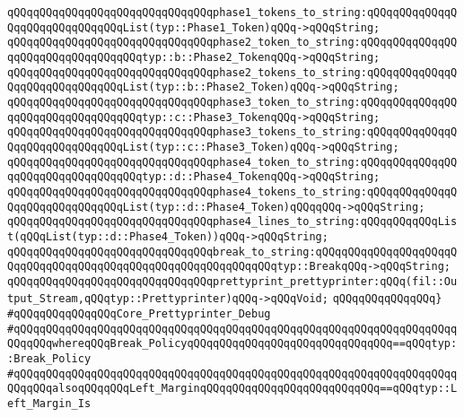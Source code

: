 \verb|qQQqqQQqqQQqqQQqqQQqqQQqqQQqqQQqphase1_tokens_to_string:qQQqqQQqqQQqqQQqqQQqqQQqqQQqqQQqList(typ::Phase1_Token)qQQq->qQQqString;|\newline
\newline
\verb|qQQqqQQqqQQqqQQqqQQqqQQqqQQqqQQqphase2_token_to_string:qQQqqQQqqQQqqQQqqQQqqQQqqQQqqQQqqQQqtyp::b::Phase2_TokenqQQq->qQQqString;|\newline
\verb|qQQqqQQqqQQqqQQqqQQqqQQqqQQqqQQqphase2_tokens_to_string:qQQqqQQqqQQqqQQqqQQqqQQqqQQqqQQqList(typ::b::Phase2_Token)qQQq->qQQqString;|\newline
\newline
\verb|qQQqqQQqqQQqqQQqqQQqqQQqqQQqqQQqphase3_token_to_string:qQQqqQQqqQQqqQQqqQQqqQQqqQQqqQQqqQQqtyp::c::Phase3_TokenqQQq->qQQqString;|\newline
\verb|qQQqqQQqqQQqqQQqqQQqqQQqqQQqqQQqphase3_tokens_to_string:qQQqqQQqqQQqqQQqqQQqqQQqqQQqqQQqList(typ::c::Phase3_Token)qQQq->qQQqString;|\newline
\newline
\verb|qQQqqQQqqQQqqQQqqQQqqQQqqQQqqQQqphase4_token_to_string:qQQqqQQqqQQqqQQqqQQqqQQqqQQqqQQqqQQqtyp::d::Phase4_TokenqQQq->qQQqString;|\newline
\verb|qQQqqQQqqQQqqQQqqQQqqQQqqQQqqQQqphase4_tokens_to_string:qQQqqQQqqQQqqQQqqQQqqQQqqQQqqQQqList(typ::d::Phase4_Token)qQQqqQQq->qQQqString;|\newline
\verb|qQQqqQQqqQQqqQQqqQQqqQQqqQQqqQQqphase4_lines_to_string:qQQqqQQqqQQqList(qQQqList(typ::d::Phase4_Token))qQQq->qQQqString;|\newline
\newline
\verb|qQQqqQQqqQQqqQQqqQQqqQQqqQQqqQQqbreak_to_string:qQQqqQQqqQQqqQQqqQQqqQQqqQQqqQQqqQQqqQQqqQQqqQQqqQQqqQQqqQQqqQQqtyp::BreakqQQq->qQQqString;|\newline
\newline
\verb|qQQqqQQqqQQqqQQqqQQqqQQqqQQqqQQqprettyprint_prettyprinter:qQQq(fil::Output_Stream,qQQqtyp::Prettyprinter)qQQq->qQQqVoid;|\newline
\verb|qQQqqQQqqQQqqQQq}|\newline
\newline
\verb|#qQQqqQQqqQQqqQQqCore_Prettyprinter_Debug|\newline
\verb|#qQQqqQQqqQQqqQQqqQQqqQQqqQQqqQQqqQQqqQQqqQQqqQQqqQQqqQQqqQQqqQQqqQQqqQQqqQQqwhereqQQqBreak_PolicyqQQqqQQqqQQqqQQqqQQqqQQqqQQqqQQq==qQQqtyp::Break_Policy|\newline
\verb|#qQQqqQQqqQQqqQQqqQQqqQQqqQQqqQQqqQQqqQQqqQQqqQQqqQQqqQQqqQQqqQQqqQQqqQQqqQQqalsoqQQqqQQqLeft_MarginqQQqqQQqqQQqqQQqqQQqqQQqqQQq==qQQqtyp::Left_Margin_Is|\newline
